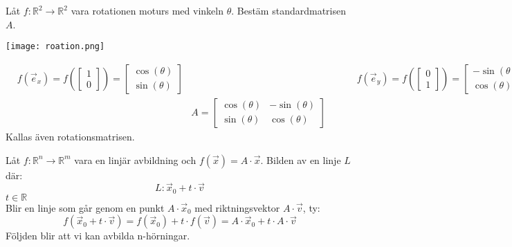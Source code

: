 \begin{Ex}
	Låt $f: \mathbb{R}^2 \rightarrow \mathbb{R}^2$ vara rotationen moturs med vinkeln $\theta$. Bestäm standardmatrisen $A$.
	\begin{center}
		\texttt{[image: roation.png]}	    	
	\end{center}	
	\begin{align*}
	&f(\vec{e}_x) = f(\begin{bmatrix} 1\\0 \end{bmatrix}) = \begin{bmatrix} \cos(\theta)\\\sin(\theta) \end{bmatrix} && &&&f(\vec{e}_y) = f(\begin{bmatrix} 0\\1 \end{bmatrix}) = \begin{bmatrix} -\sin(\theta)\\\cos(\theta) \end{bmatrix}\\
	&&A = \begin{bmatrix} \cos(\theta)&-\sin(\theta)\\\sin(\theta)&\cos(\theta) \end{bmatrix}
	\end{align*}
	Kallas även rotationsmatrisen.
\end{Ex}
\newpage
\noindent
Låt $f: \mathbb{R}^n \rightarrow \mathbb{R}^m$ vara en linjär avbildning och $f(\vec{x}) = A \cdot \vec{x}$. Bilden av en linje $L$ där:
\[
    L: \vec{x}_0 + t \cdot \vec{v}
\]
$t\in \mathbb{R}$\\
Blir en linje som går genom en punkt $A \cdot \vec{x}_0$ med riktningsvektor $A \cdot \vec{v}$, ty:
\[
    f(\vec{x}_0 + t \cdot \vec{v}) = f(\vec{x}_0) + t \cdot f(\vec{v}) = A \cdot \vec{x}_0 + t \cdot A \cdot \vec{v}
\]
Följden blir att vi kan avbilda n-hörningar.
